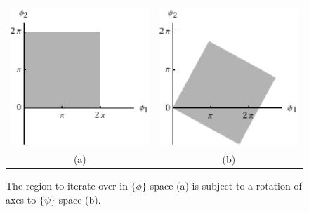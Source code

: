 \begin{figure}[htp]
	\centering
	\begin{tabular}{c c}
	\includegraphics[scale=0.6]{phiblock.eps} & \includegraphics[scale=0.6]{psiblock.eps} \\
	(a) & (b)
	\end{tabular}
	\caption{The region to iterate over in $\lbrace\phi\rbrace$-space (a) is subject to a rotation of axes to $\lbrace\psi\rbrace$-space (b).}
	\label{fig:phipsi}
\end{figure}

